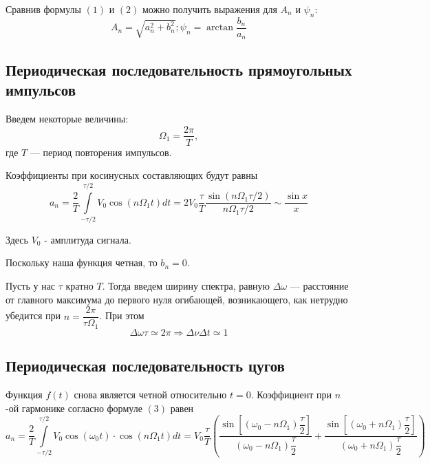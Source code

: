 \documentclass[a4paper, 12pt]{article}%
\begin{document}
Сравнив формулы $(1)$ и $(2)$ можно получить выражения для $A_n$  и $\psi_n$:
\begin{equation}
A_n = \sqrt{a_n^2+b_n^2};\psi_n = \arctan \dfrac{b_n}{a_n}
\end{equation}
\subsection*{Периодическая последовательность прямоугольных импульсов}
Введем некоторые величины:
\[\Omega_1 = \dfrac{2\pi}{T}, \]
где $T$ --- период повторения импульсов.

Коэффициенты при косинусных составляющих будут равны
\begin{equation}
a_n = \dfrac{2}{T}\int\limits_{-\tau/2}^{\tau/2}V_0\cos\left(n\Omega_1 t\right)dt = 2V_0\dfrac{\tau}{T}\dfrac{\sin\left(n\Omega_1\tau/2\right)}{n\Omega_1\tau/2} \sim \dfrac{\sin x}{x}
\end{equation}

Здесь $V_0$ - амплитуда сигнала.

Поскольку наша функция четная, то $b_n = 0$. 

Пусть у нас $\tau$ кратно $T$. Тогда введем ширину спектра, равную $\Delta \omega$ --- расстояние от главного максимума до первого нуля огибающей, возникающего, как нетрудно убедится при $n = \dfrac{2\pi}{\tau \Omega_1}$. При 
этом
\begin{equation}
\Delta \omega \tau \simeq 2\pi \Rightarrow \Delta \nu \Delta t \simeq 1
\end{equation}
\subsection*{Периодическая последовательность цугов}
Функция $f(t)$ снова является четной относительно $t = 0$. Коэффициент при $n$-ой гармонике согласно формуле $(3)$ равен
\begin{equation}
a_n = \dfrac{2}{T}\int\limits_{-\tau/2}^{\tau/2}V_0 \cos \left(\omega_0t\right) \cdot \cos\left(n \Omega_1t\right)dt = V_0 \dfrac{\tau}{T}\left( \dfrac{\sin\left[\left(\omega_0 - n \Omega_1\right)\dfrac{\tau}{2}\right]}{\left( \omega_0 - n \Omega_1\right) \dfrac{\tau}{2}} + \dfrac{\sin\left[\left(\omega_0 + n \Omega_1\right)\dfrac{\tau}{2}\right]}{\left( \omega_0 + n \Omega_1\right) \dfrac{\tau}{2}}\right)
\end{equation}
\end{document}
